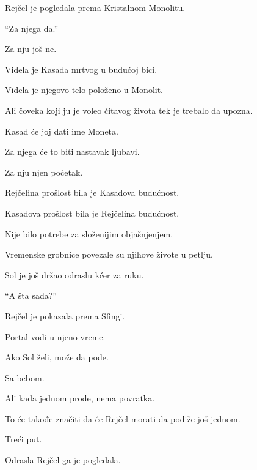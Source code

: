 Rejčel je pogledala prema Kristalnom Monolitu.

\bigskip

``Za njega da.''

\bigskip

Za nju još ne.

\bigskip

Videla je Kasada mrtvog u budućoj bici.

Videla je njegovo telo položeno u Monolit.

\bigskip

Ali čoveka koji ju je voleo čitavog života tek je trebalo da upozna.

\bigskip

Kasad će joj dati ime Moneta.

\bigskip

Za njega će to biti nastavak ljubavi.

Za nju njen početak.

\bigskip

Rejčelina prošlost bila je Kasadova budućnost.

Kasadova prošlost bila je Rejčelina budućnost.

\bigskip

Nije bilo potrebe za složenijim objašnjenjem.

\bigskip

Vremenske grobnice povezale su njihove živote u petlju.

\bigskip

Sol je još držao odraslu kćer za ruku.

``A šta sada?''

\bigskip

Rejčel je pokazala prema Sfingi.

\bigskip

Portal vodi u njeno vreme.

\bigskip

Ako Sol želi, može da pođe.

Sa bebom.

\bigskip

Ali kada jednom prođe, nema povratka.

\bigskip

To će takođe značiti da će Rejčel morati da podiže još jednom.

\bigskip

Treći put.

\bigskip

Odrasla Rejčel ga je pogledala.

